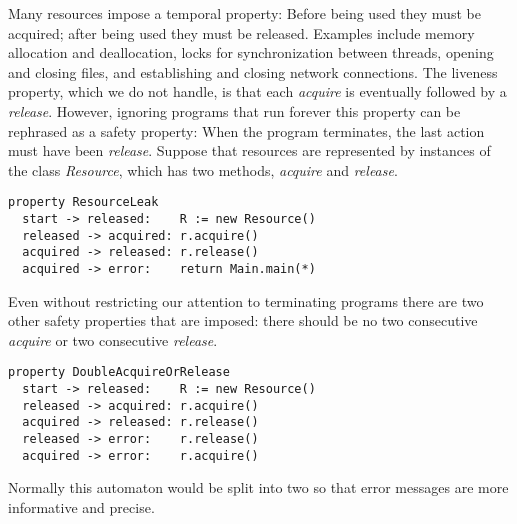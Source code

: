 \documentclass[preprint]{sigplanconf} %
\theoremstyle{definition}
\begin{document}
Many resources impose a temporal property:
Before being used they must be acquired;
after being used they must be released.
Examples include memory allocation and deallocation, locks for synchronization between threads, opening and closing files, and establishing and closing network connections.
The liveness property, which we do not handle, is that each \textit{acquire} is eventually followed by a \textit{release}.
However, ignoring programs that run forever this property can be rephrased as a safety property:
When the program terminates, the last action must have been \textit{release}.
Suppose that resources are represented by instances of the class \textit{Resource}, which has two methods, \textit{acquire} and \textit{release}.
\par\medskip\noindent
\begin{Verbatim}
property ResourceLeak
  start -> released:    R := new Resource()
  released -> acquired: r.acquire()
  acquired -> released: r.release()
  acquired -> error:    return Main.main(*)
\end{Verbatim}
\par\medskip\noindent
Even without restricting our attention to terminating programs there are two other safety properties that are imposed:
there should be no two consecutive \textit{acquire} or two consecutive \textit{release}.
\par\medskip\noindent
\begin{Verbatim}
property DoubleAcquireOrRelease
  start -> released:    R := new Resource()
  released -> acquired: r.acquire()
  acquired -> released: r.release()
  released -> error:    r.release()
  acquired -> error:    r.acquire()
\end{Verbatim}
\par\medskip\noindent
Normally this automaton would be split into two so that error messages are more informative and precise.
\end{document}
